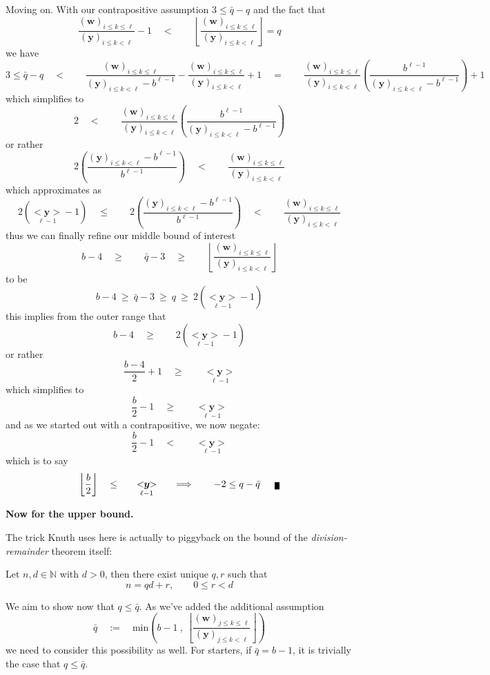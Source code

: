 \documentclass[twoside]{article}
\renewcommand{\leq}{\ensuremath{\quad\le\qquad}}
\renewcommand{\geq}{\ensuremath{\quad\ge\qquad}}
\newcommand{\bunderseq}[2][u]{\ensuremath{\underset{#2}{<\!\!\bm{#1}\!\!>}}}
\newcommand{\numer}[3][w]{\ensuremath{(\bm{#1})_{#2\le k\le #3}}}
\newcommand{\denom}[3][y]{\ensuremath{(\bm{#1})_{#2\le k <  #3}}}
\newcommand{\qed}{\nobreak \ifvmode \relax \else
      \ifdim\lastskip<1.5em \hskip-\lastskip
      \hskip1.5em plus0em minus0.5em \fi \nobreak
      \vrule height0.5em width0.5em depth0.25em\fi}
\begin{document}
Moving on. With our contrapositive assumption $ 3\le\bar{q}-q $ and the fact that
$$ \frac{\numer{i}{\ell}}{\denom{i}{\ell}}-1\quad <\qquad\left\lfloor\frac{\numer{i}{\ell}}{\denom{i}{\ell}}\right\rfloor=q $$
we have
$$ 3\le\bar{q}-q
	\quad <\qquad\frac{\numer{i}{\ell}}{\denom{i}{\ell}-b^{\ell-1}}-\frac{\numer{i}{\ell}}{\denom{i}{\ell}}+1
	\quad =\qquad\frac{\numer{i}{\ell}}{\denom{i}{\ell}}\left(\frac{b^{\ell-1}}{\denom{i}{\ell}-b^{\ell-1}}\right)+1 $$
which simplifies to
$$ 2\quad <\qquad \frac{\numer{i}{\ell}}{\denom{i}{\ell}}\left(\frac{b^{\ell-1}}{\denom{i}{\ell}-b^{\ell-1}}\right) $$
or rather
$$ 2\left(\frac{\denom{i}{\ell}-b^{\ell-1}}{b^{\ell-1}}\right)\quad <\qquad \frac{\numer{i}{\ell}}{\denom{i}{\ell}} $$
which approximates as
$$ 2\left(\bunderseq[y]{\ell-1}-1\right)
	\leq 2\left(\frac{\denom{i}{\ell}-b^{\ell-1}}{b^{\ell-1}}\right)
	\quad <\qquad \frac{\numer{i}{\ell}}{\denom{i}{\ell}} $$
thus we can finally refine our middle bound of interest
$$ b-4\geq\bar{q}-3
	\geq\left\lfloor\frac{\numer{i}{\ell}}{\denom{i}{\ell}}\right\rfloor $$
to be
$$ b-4\ \ge\ \bar{q}-3\ \ge\ q\ \ge\ 2\left(\bunderseq[y]{\ell-1}-1\right) $$
this implies from the outer range that
$$ b-4\geq 2\left(\bunderseq[y]{\ell-1}-1\right) $$
or rather
$$ \frac{b-4}{2}+1\geq\bunderseq[y]{\ell-1} $$
which simplifies to
$$ \frac{b}{2}-1\geq\bunderseq[y]{\ell-1} $$
and as we started out with a contrapositive, we now negate:
$$ \frac{b}{2}-1\quad <\qquad\bunderseq[y]{\ell-1} $$
which is to say
$$ \left\lfloor\frac{b}{2}\right\rfloor\leq\bunderseq[y]{\ell-1}\qquad\Longrightarrow\qquad -2\le q-\bar{q}\qed $$

{\bfseries Now for the upper bound.}

The trick Knuth uses here is actually to piggyback on the bound of the \emph{division-remainder} theorem itself:

Let $ n,d\in\mathbb{N} $ with $ d > 0 $, then there exist unique $ q, r $ such that
$$ n=qd+r,\qquad 0\le r < d $$

We aim to show now that $ q\le\bar{q} $. As we've added the additional assumption
$$ \bar{q}\quad:=\quad\mbox{min}\left(b-1\ ,\ \left\lfloor\frac{\numer{j}{\ell}}{\denom{j}{\ell}}\right\rfloor\right) $$
we need to consider this possibility as well. For starters, if $ \bar{q}=b-1 $, it is trivially the case that $ q\le\bar{q} $.
\end{document}
